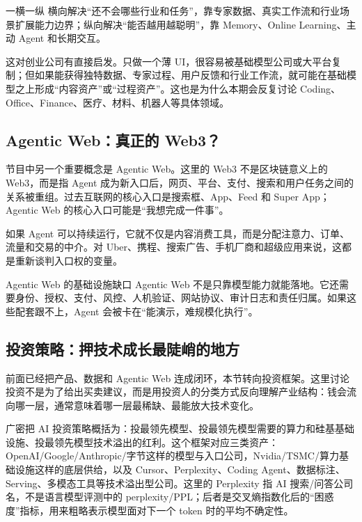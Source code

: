 \documentclass[a4paper]{article}
\begin{document}
\begin{importantbox}{一横一纵}
横向解决“还不会哪些行业和任务”，靠专家数据、真实工作流和行业场景扩展能力边界；纵向解决“能否越用越聪明”，靠 Memory、Online Learning、主动 Agent 和长期交互。
\end{importantbox}

这对创业公司有直接启发。只做一个薄 UI，很容易被基础模型公司或大平台复制；但如果能获得独特数据、专家过程、用户反馈和行业工作流，就可能在基础模型之上形成“内容资产”或“过程资产”。这也是为什么本期会反复讨论 Coding、Office、Finance、医疗、材料、机器人等具体领域。

\subsection{Agentic Web：真正的 Web3？}

节目中另一个重要概念是 Agentic Web。这里的 Web3 不是区块链意义上的 Web3，而是指 Agent 成为新入口后，网页、平台、支付、搜索和用户任务之间的关系被重组。过去互联网的核心入口是搜索框、App、Feed 和 Super App；Agentic Web 的核心入口可能是“我想完成一件事”。

如果 Agent 可以持续运行，它就不仅是内容消费工具，而是分配注意力、订单、流量和交易的中介。对 Uber、携程、搜索广告、手机厂商和超级应用来说，这都是重新谈判入口权的变量。

\begin{warningbox}{Agentic Web 的基础设施缺口}
Agentic Web 不是只靠模型能力就能落地。它还需要身份、授权、支付、风控、人机验证、网站协议、审计日志和责任归属。如果这些配套跟不上，Agent 会被卡在“能演示，难规模化执行”。
\end{warningbox}

\subsection{投资策略：押技术成长最陡峭的地方}

前面已经把产品、数据和 Agentic Web 连成闭环，本节转向投资框架。这里讨论投资不是为了给出买卖建议，而是用投资人的分类方式反向理解产业结构：钱会流向哪一层，通常意味着哪一层最稀缺、最能放大技术变化。

广密把 AI 投资策略概括为：投最领先模型、投最领先模型需要的算力和硅基基础设施、投最领先模型技术溢出的红利。这个框架对应三类资产：OpenAI/Google/Anthropic/字节这样的模型与入口公司，Nvidia/TSMC/算力基础设施这样的底层供给，以及 Cursor、Perplexity、Coding Agent、数据标注、Serving、多模态工具等技术溢出型公司。这里的 Perplexity 指 AI 搜索/问答公司名，不是语言模型评测中的 perplexity/PPL；后者是交叉熵指数化后的“困惑度”指标，用来粗略表示模型面对下一个 token 时的平均不确定性。
\end{document}
